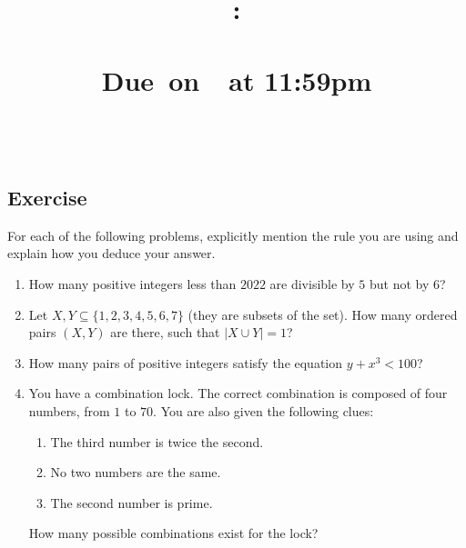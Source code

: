 \documentclass{article}
\title{
    \vspace{2in}
    \textbf{\hmwkClass:\\ \hmwkTitle}\\
    \normalsize\vspace{0.1in}\small{Due\ on\ \hmwkDueDate\ at 11:59pm}\\
    \vspace{0.1in}\large{\textit{\hmwkClassInstructor\ \hmwkSection}}
    \vspace{3in}
    \author{\textbf{\hmwkAuthorName}}
    \date{}
}
\newcounter{counter}
\newcommand{\Exercise}{Exercise \stepcounter{counter}\thecounter}
\begin{document}
    
\maketitle
\pagebreak

\subsection*{\Exercise}
    For each of the following problems, explicitly mention the rule you are using and explain how you deduce your answer.
    \begin{enumerate}
        \item How many positive integers less than $2022$ are divisible by $5$ but not by $6$?
        \item Let $X, Y \subseteq \{1, 2, 3, 4, 5, 6, 7\}$ (they are subsets of the set).  How many ordered pairs $(X, Y)$ are there, such that $|X \cup Y| = 1$?
        \item How many pairs of positive integers satisfy the equation $y + x^{3} < 100$?
        \item You have a combination lock. The correct combination is composed of four numbers, from $1$ to $70$. You are also given the following clues:
        \begin{enumerate}[label = \arabic*.]
            \item The third number is twice the second.
            \item No two numbers are the same.
            \item The second number is prime.
        \end{enumerate}
        How many possible combinations exist for the lock?
    \end{enumerate}
\end{document}
